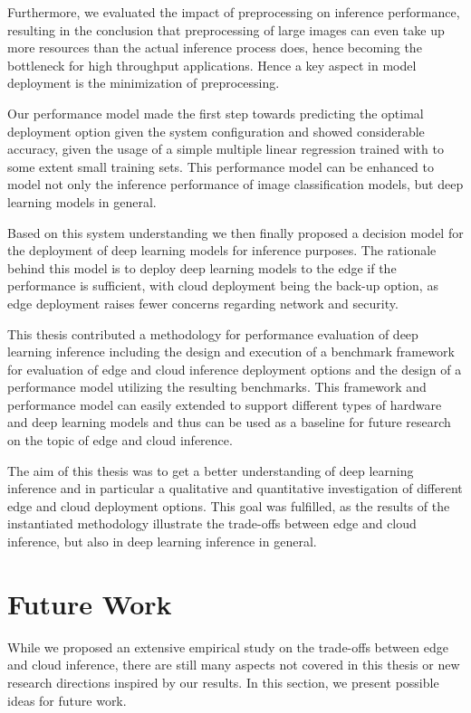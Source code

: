 Furthermore, we evaluated the impact of preprocessing on inference performance, resulting in the conclusion that preprocessing of large images can even take up more resources than the actual inference process does, hence becoming the bottleneck for high throughput applications.
Hence a key aspect in model deployment is the minimization of preprocessing.

Our performance model made the first step towards predicting the optimal deployment option given the system configuration and showed considerable accuracy, given the usage of a simple multiple linear regression trained with to some extent small training sets.
This performance model can be enhanced to model not only the inference performance of image classification models, but deep learning models in general.

Based on this system understanding we then finally proposed a decision model for the deployment of deep learning models for inference purposes. The rationale behind this model is to deploy deep learning models to the edge if the performance is sufficient, with cloud deployment being the back-up option, as edge deployment raises fewer concerns regarding network and security.

This thesis contributed a methodology for performance evaluation of deep learning inference including the design and execution of a benchmark framework for evaluation of edge and cloud inference deployment options and the design of a performance model utilizing the resulting benchmarks.
This framework and performance model can easily extended to support different types of hardware and deep learning models and thus can be used as a baseline for future research on the topic of edge and cloud inference.

The aim of this thesis was to get a better understanding of deep learning inference and in particular a qualitative and quantitative investigation of different edge and cloud deployment options.
This goal was fulfilled, as the results of the instantiated methodology illustrate the trade-offs between edge and cloud inference, but also in deep learning inference in general.



\section{Future Work}
While we proposed an extensive empirical study on the trade-offs between edge and cloud inference, there are still many aspects not covered in this thesis or new research directions inspired by our results. 
In this section, we present possible ideas for future work.

